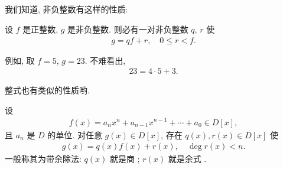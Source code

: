 \subsection*{\DivisionAlgorithm}
\markright{\DivisionAlgorithm}

我们知道, 非负整数有这样的性质:

\begin{proposition}
    设 $f$ 是正整数, $g$ 是非负整数. 则必有一对非负整数 $q$, $r$ 使
    \begin{align*}
        g = qf + r, \quad 0 \leq r < f.
    \end{align*}
\end{proposition}

例如, 取 $f=5$, $g=23$. 不难看出,
\begin{align*}
    23 = 4 \cdot 5 + 3.
\end{align*}

整式也有类似的性质哟.

\begin{proposition}
    设
    \begin{align*}
        f(x) = a_n x^n + a_{n-1} x^{n-1} + \cdots + a_0 \in D[x],
    \end{align*}
    且 $a_n$ 是 $D$ 的单位. 对任意 $g(x) \in D[x]$, 存在 $q(x), r(x) \in D[x]$ 使
    \begin{align*}
        g(x) = q(x) f(x) + r(x), \quad \deg r(x) < n.
    \end{align*}
    一般称其为带余除法: $q(x)$ 就是商 ; $r(x)$ 就是余式 .
\end{proposition}

